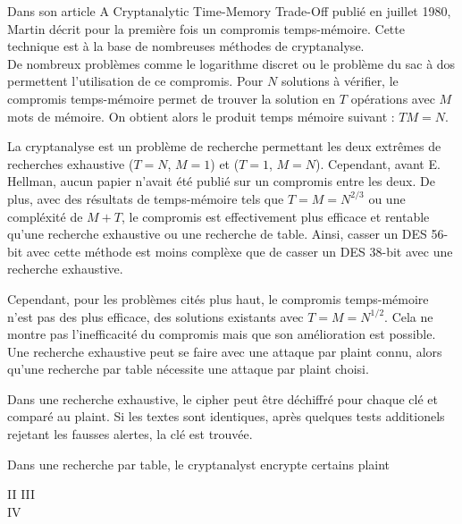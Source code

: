 
	Dans son article \og{}A Cryptanalytic Time-Memory Trade-Off\fg{}\cite{ehellman} publié en juillet 1980, Martin  décrit pour la première fois un compromis temps-mémoire. Cette technique est à la base de nombreuses méthodes de cryptanalyse.\\

	De nombreux problèmes comme le logarithme discret ou le problème du sac à dos permettent l'utilisation de ce compromis. Pour $N$ solutions à vérifier, le compromis temps-mémoire permet de trouver la solution en $T$ opérations avec $M$ mots de mémoire. On obtient alors le produit temps mémoire suivant : $TM = N$.

	La cryptanalyse est un problème de recherche permettant les deux extrêmes de recherches exhaustive ($T=N$, $M=1$) et ($T=1$, $M=N$). Cependant, avant E. Hellman\cite{ehellman}, aucun papier n'avait été publié sur un compromis entre les deux. De plus, avec des résultats de temps-mémoire tels que $T = M = N^{2/3}$ ou une compléxité de $M + T$, le compromis est effectivement plus efficace et rentable qu'une recherche exhaustive ou une recherche de table. Ainsi, casser un DES 56-bit avec cette méthode est moins complèxe que de casser un DES 38-bit avec une recherche exhaustive.

	Cependant, pour les problèmes cités plus haut, le compromis temps-mémoire n'est pas des plus efficace, des solutions existants avec $T = M = N^{1/2}$. Cela ne montre pas l'inefficacité du compromis mais que son amélioration est possible.\\

	Une recherche exhaustive peut se faire avec une attaque par \gls{plaint} connu, alors qu'une recherche par table nécessite une attaque par \gls{plaint} choisi.

	Dans une recherche exhaustive, le \gls{cipher} peut être déchiffré pour chaque clé et comparé au \gls{plaint}. Si les textes sont identiques, après quelques tests additionels rejetant les fausses alertes, la clé est trouvée.

	Dans une recherche par table, le cryptanalyst encrypte certains \gls{plaint}

	\clearpage
	II
	III\\

	\clearpage
	IV

\endinput{}
